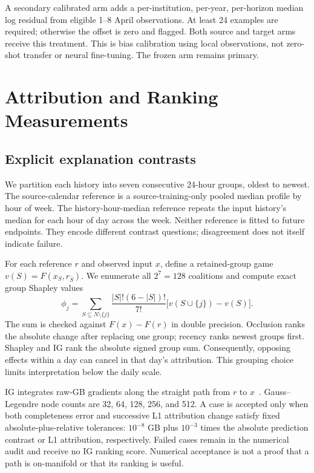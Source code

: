 \documentclass[conference]{IEEEtran}
\begin{document}
A secondary calibrated arm adds a per-institution, per-year, per-horizon median log residual from eligible 1--8 April observations. At least 24 examples are required; otherwise the offset is zero and flagged. Both source and target arms receive this treatment. This is bias calibration using local observations, not zero-shot transfer or neural fine-tuning. The frozen arm remains primary.

\section{Attribution and Ranking Measurements}
\subsection{Explicit explanation contrasts}
We partition each history into seven consecutive 24-hour groups, oldest to newest. The source-calendar reference is a source-training-only pooled median profile by hour of week. The history-hour-median reference repeats the input history's median for each hour of day across the week. Neither reference is fitted to future endpoints. They encode different contrast questions; disagreement does not itself indicate failure.

For each reference $r$ and observed input $x$, define a retained-group game $v(S)=F(x_S,r_{\bar S})$. We enumerate all $2^7=128$ coalitions and compute exact group Shapley values
\begin{equation}
\phi_j=\sum_{S\subseteq N\setminus\{j\}}\frac{|S|!(6-|S|)!}{7!}\big[v(S\cup\{j\})-v(S)\big].
\end{equation}
The sum is checked against $F(x)-F(r)$ in double precision. Occlusion ranks the absolute change after replacing one group; recency ranks newest groups first. Shapley and IG rank the absolute signed group sum. Consequently, opposing effects within a day can cancel in that day's attribution. This grouping choice limits interpretation below the daily scale.

IG integrates raw-GB gradients along the straight path from $r$ to $x$~\cite{ig}. Gauss--Legendre node counts are 32, 64, 128, 256, and 512. A case is accepted only when both completeness error and successive L1 attribution change satisfy fixed absolute-plus-relative tolerances: $10^{-8}$ GB plus $10^{-3}$ times the absolute prediction contrast or L1 attribution, respectively. Failed cases remain in the numerical audit and receive no IG ranking score. Numerical acceptance is not a proof that a path is on-manifold or that its ranking is useful.
\end{document}
